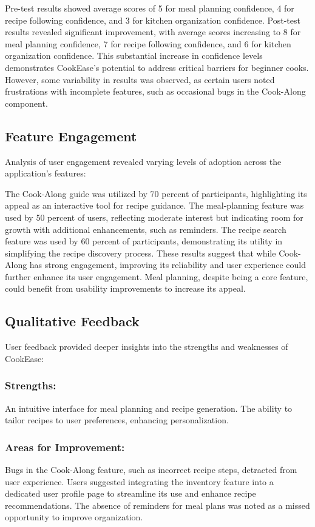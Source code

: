 \documentclass[10pt,twocolumn]{article}
\begin{document}
Pre-test results showed average scores of 5 for meal planning confidence, 4 for recipe following confidence, and 3 for kitchen organization confidence.
Post-test results revealed significant improvement, with average scores increasing to 8 for meal planning confidence, 7 for recipe following confidence, and 6 for kitchen organization confidence.
This substantial increase in confidence levels demonstrates CookEase's potential to address critical barriers for beginner cooks. However, some variability in results was observed, as certain users noted frustrations with incomplete features, such as occasional bugs in the Cook-Along component.

\subsection{Feature Engagement}
Analysis of user engagement revealed varying levels of adoption across the application’s features:

The Cook-Along guide was utilized by 70 percent of participants, highlighting its appeal as an interactive tool for recipe guidance.
The meal-planning feature was used by 50 percent of users, reflecting moderate interest but indicating room for growth with additional enhancements, such as reminders.
The recipe search feature was used by 60 percent of participants, demonstrating its utility in simplifying the recipe discovery process.
These results suggest that while Cook-Along has strong engagement, improving its reliability and user experience could further enhance its user engagement. Meal planning, despite being a core feature, could benefit from usability improvements to increase its appeal.

\subsection{Qualitative Feedback}
User feedback provided deeper insights into the strengths and weaknesses of CookEase:
\subsubsection{Strengths:}
An intuitive interface for meal planning and recipe generation.
The ability to tailor recipes to user preferences, enhancing personalization.
\subsubsection{Areas for Improvement:}
Bugs in the Cook-Along feature, such as incorrect recipe steps, detracted from user experience.
Users suggested integrating the inventory feature into a dedicated user profile page to streamline its use and enhance recipe recommendations.
The absence of reminders for meal plans was noted as a missed opportunity to improve organization.
\end{document}
